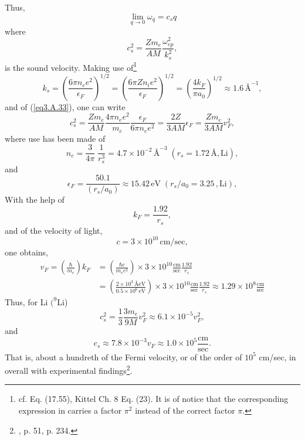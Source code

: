 \begin{subappendices}
Thus,
\begin{equation}\label{eqC2AppA4}
\lim_{q\rightarrow 0}\omega_q=c_sq
\end{equation}
where
\begin{equation}\label{eqC2AppA5}
c^2_s=\frac{Zm_e}{AM}\frac{\omega_{ep}^2}{k_s^2},
\end{equation}
is the sound velocity. Making use of\footnote{cf. \cite{Ashcroft:87} Eq. (17.55), Kittel Ch. 8 Eq. (23). It is of notice that the corresponding expression in \cite{Ketterson:99} carries a factor $\pi^2$ instead of the correct factor $\pi$.}
\begin{equation}\label{eqC2AppA6}
k_s=\left(\frac{6\pi n_e e^2}{\epsilon_F}\right)^{1/2}=\left(\frac{6\pi Z n_i e^2}{\epsilon_F}\right)^{1/2}=\left(\frac{4k_F}{\pi a_0}\right)^{1/2}\approx 1.6\,\text{\AA}^{-1},
\end{equation}
and of (\ref{eq3.A.33}),
one can write
\begin{equation}\label{eqC2AppA8}
c_s^2=\frac{Zm_e}{AM}\frac{4\pi n_ee^2}{m_e}\frac{\epsilon_F}{6\pi n_e e^2}=\frac{2Z}{3 AM}\epsilon_F=\frac{Zm_e}{3 AM}v_F^2,
\end{equation}
where use has been made of
\begin{equation}\label{eqC2AppA56}
n_e=\frac{3}{4\pi}\;\frac{1}{r_s^3}=4.7\times10^{-2}\,\text{\AA}^{-3}\;(r_s=1.72\,\text{\AA},\text{Li}),
\end{equation}
and
\begin{equation}\label{eqC2AppA57}
\epsilon_F=\frac{50.1}{(r_s/a_0)}\approx 15.42\,\text{eV}\;(r_s/a_0=3.25\,,\text{Li}),
\end{equation}
With the help of
\begin{equation}\label{eqC2AppA9}
k_F=\frac{1.92}{r_s},
\end{equation}
and of the velocity of light,
\begin{equation}\label{eqC2AppA10}
c=3\times 10^{10}\,\text{cm/sec},
\end{equation}
one obtains,
\begin{align}\label{eqC2AppA11}
\nonumber v_F=\left(\frac{\hbar}{m_e}\right)k_F&
=\left(\frac{\hbar c}{m_e c^2}\right)\times 3\times 10^{10}\frac{\text{cm}}{\text{sec}}\frac{1.92}{r_s}\\
&=\left(\frac{2\times 10^3\,\text{\AA eV}}{0.5\times 10^6\,\text{eV}}\right)\times 3\times 10^{10}\frac{\text{cm}}{\text{sec}}\frac{1.92}{r_s}
\approx 1.29\times 10^8 \frac{\text{cm}}{\text{sec}}
\end{align}
Thus, for Li $(^9$Li) 
\begin{equation}\label{eqC2AppA12}
c_s^2=\frac{1}{3}\frac{3m_e}{9M}v_F^2\approx 6.1\times 10^{-5}v_F^2,
\end{equation}
and
\begin{equation}\label{eqC2AppA13}
c_s\approx 7.8\times 10^{-3}v_F\approx 1.0\times 10^5 \frac{\text{cm}}{\text{sec}}.
\end{equation}
That is, about a hundreth of the Fermi velocity, or of the order of $10^5$ cm/sec, in overall  with  experimental findings\footnote{\cite{Ashcroft:87}, p. 51, \cite{Ketterson:99} p. 234.}.




\end{subappendices}
